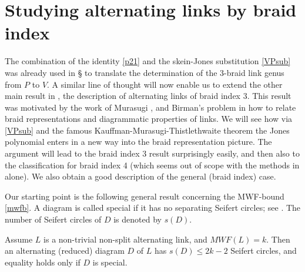 % 

\section{Studying alternating links by braid index\label{Sfg}}

The combination of the identity \eqref{p21} and the skein-Jones
substitution \eqref{VPsub} was already used in \S{}
to translate the determination of the 3-braid link genus from
$P$ to $V$. A similar line of thought will now enable us to
extend the other main result in \cite{3br}, the description
of alternating links of braid index 3. This result was
motivated by the work of Murasugi \cite{Murasugi},
and Birman's problem in \cite{MortonPb} how to
relate braid representations and diagrammatic properties
of links. We will see how via \eqref{VPsub} and 
the famous Kauffman-Murasugi-Thistlethwaite theorem
\cite{Kauffman2,Murasugi3,Thistle2} the Jones polynomial
enters in a new way into the braid representation picture.
The argument will lead to the braid index 3
result surprisingly easily, and then also to the
classification for braid index 4 (which seems out of scope
with the methods in \cite{3br} alone). We also obtain a
good description of the general (braid index) case.

Our starting point is the following general result concerning the
MWF-bound \eqref{mwfb}. A diagram is called special if it
has no separating Seifert circles; see \cite{Cromwell}.
The number of Seifert circles of $D$ is denoted by $s(D)$.

\begin{theorem}\label{_ty}
Assume $L$ is a non-trivial non-split alternating link, and $MWF(L)=
k$. Then an alternating (reduced) diagram $D$ of $L$ has $s(D)\le 2k-
2$ Seifert circles, and equality holds only if $D$ is special.
\end{theorem}

